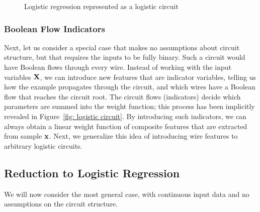 \documentclass[letterpaper]{article} %
\newcommand{\sample}{{\bf x}}
\begin{document}
\begin{figure}[t]
\begin{minipage}{0.48\textwidth}
{
}
\caption{Logistic regression represented as a logistic circuit}
\label{circuit: linear weights}
\end{minipage}
\end{figure}


\subsubsection{Boolean Flow Indicators}
Next, let us consider a special case that makes no assumptions about circuit structure, but that requires the inputs to be fully binary. 
Such a circuit would have Boolean flows through every wire. 
Instead of working with the input variables $\bf X$, we can introduce new features that are indicator variables, telling us how the example propagates through the circuit, and which wires have a Boolean flow that reaches the circuit root. The circuit flows (indicators) decide which parameters are summed into the weight function; this process has been implicitly revealed in Figure~\ref{fig: logistic circuit}. By introducing such indicators, we can always obtain a linear weight function of composite features that are extracted from sample $\sample$. 
Next, we generalize this idea of introducing wire features to arbitrary logistic circuits.

\subsection{Reduction to Logistic Regression}
We will now consider the most general case, with continuous input data and no assumptions on the circuit structure.
\end{document}
